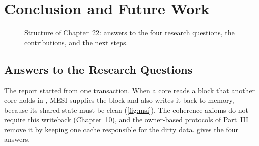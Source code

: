 \chapter{Conclusion and Future Work}
\label{ch:conclusion}

\begin{figure}[htbp]
\centering
{}
\caption[]{Structure of Chapter~22: answers to the four
research questions, the contributions, and the next steps.}
\label{fig:ch22-map}
\end{figure}

\section{Answers to the Research Questions}
\label{sec:conc-problem}
\label{sec:conc-answers}
%

The report started from one transaction. When a core reads a block that another
core holds in \stM, MESI supplies the block and also writes it back to memory,
because its shared state must be clean (\cref{fig:msi}). The coherence axioms do not
require this writeback (Chapter~10), and the owner-based protocols of Part~III
remove it by keeping one cache responsible for the dirty data.
 gives the four answers.

